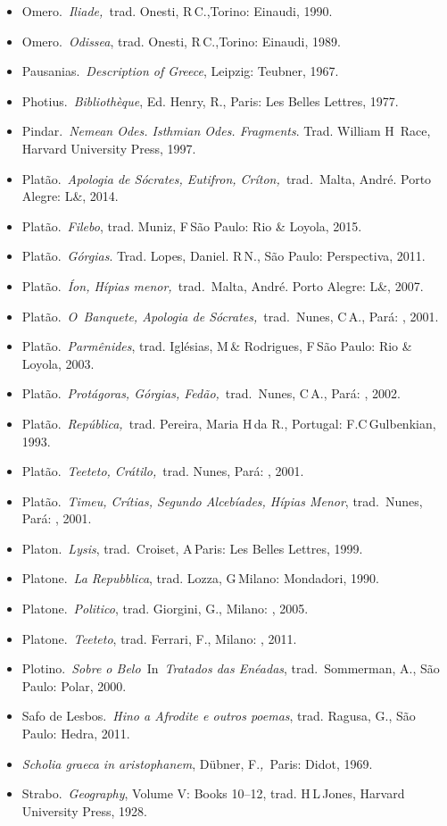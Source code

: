 {\begin{itemize}
  Menander (Rhetor).~\emph{Division of Epideictic Speeches}, ed. Russel,
  D\,A\,\& Wilson, N\,G., Oxford: Oxford University Press, 1981.
\item
  Omero.~\emph{Iliade,~}trad. Onesti, R\,C.,Torino: Einaudi, 1990.
\item
  Omero.~\emph{Odissea}, trad. Onesti, R\,C.,Torino: Einaudi, 1989.
\item
  Pausanias.~\emph{Description of Greece}, Leipzig: Teubner, 1967.
\item
  Photius.~\emph{Bibliothèque}, Ed. Henry, R., Paris: Les Belles
  Lettres, 1977.
\item
  Pindar.~\emph{Nemean Odes. Isthmian Odes. Fragments}. Trad. William H\,  Race, Harvard University Press, 1997.
\item
  Platão.~\emph{Apologia de Sócrates, Eutifron,
  Críton,~}trad\emph{.}~Malta, André. Porto Alegre: L\&, 2014.
\item
  Platão.~\emph{Filebo}, trad. Muniz, F\,São Paulo:  Rio \& Loyola,
  2015.
\item
  Platão.~\emph{Górgias}. Trad. Lopes, Daniel. R\,N., São Paulo:
  Perspectiva, 2011.
\item
  Platão.\emph{~Íon, Hípias menor,~}trad\emph{.}~Malta, André. Porto
  Alegre: L\&, 2007.
\item
  Platão.~\emph{O~Banquete, Apologia de Sócrates,}~trad.~Nunes, C\,A.,
  Pará: , 2001.
\item
  Platão.~\emph{Parmênides}, trad. Iglésias, M\,\& Rodrigues, F\,São
  Paulo:  Rio \& Loyola, 2003.
\item
  Platão.~\emph{Protágoras, Górgias, Fedão,}~trad.~Nunes, C\,A., Pará:
  , 2002.
\item
  Platão.~\emph{República,~}trad. Pereira, Maria H\,da R., Portugal:
  F.C\,Gulbenkian, 1993.
\item
  Platão.~\emph{Teeteto, Crátilo,}~trad. Nunes, Pará: , 2001.
\item
  Platão.~\emph{Timeu, Crítias, Segundo Alcebíades, Hípias Menor},
  trad.~Nunes, Pará: , 2001.
\item
  Platon.~\emph{Lysis}, trad.~Croiset, A\,Paris: Les Belles Lettres,
  1999.
\item
  Platone.~\emph{La Repubblica}, trad. Lozza, G\,Milano: Mondadori,
  1990.
\item
  Platone.~\emph{Politico}, trad. Giorgini, G., Milano: , 2005.
\item
  Platone.~\emph{Teeteto}, trad. Ferrari, F., Milano: , 2011.
\item
  Plotino.~\emph{Sobre o Belo~}In~\emph{Tratados das Enéadas},
  trad.~Sommerman, A., São Paulo: Polar, 2000.
\item
  Safo de Lesbos.~\emph{Hino a Afrodite e outros poemas}, trad. Ragusa,
  G., São Paulo: Hedra, 2011.
\item
  \emph{Scholia graeca in aristophanem}, Dübner, F.\emph{,~}Paris:
  Didot, 1969.
\item
  Strabo.~\emph{Geography}, Volume V: Books 10--12, trad. H\,L\,Jones,
  Harvard University Press, 1928.
\end{itemize}

}
